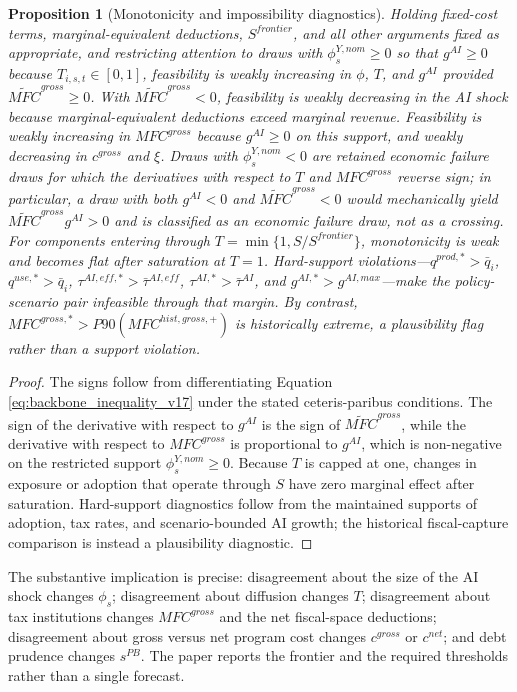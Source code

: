 \documentclass[11pt,a4paper]{article}
\newtheorem{proposition}{Proposition}
\begin{document}
\begin{proposition}[Monotonicity and impossibility diagnostics]\label{prop:monotonicity_impossibility}
Holding fixed-cost terms, marginal-equivalent deductions, $S^{frontier}$, and all other arguments fixed as appropriate, and restricting attention to draws with $\phi^{Y,nom}_s\geq0$ so that $g^{AI}\geq0$ because $T_{i,s,t}\in[0,1]$, feasibility is weakly increasing in $\phi$, $T$, and $g^{AI}$ provided $\widetilde{MFC}^{gross}\geq0$. With $\widetilde{MFC}^{gross}<0$, feasibility is weakly decreasing in the AI shock because marginal-equivalent deductions exceed marginal revenue. Feasibility is weakly increasing in $MFC^{gross}$ because $g^{AI}\geq0$ on this support, and weakly decreasing in $c^{gross}$ and $\xi$. Draws with $\phi^{Y,nom}_s<0$ are retained economic failure draws for which the derivatives with respect to $T$ and $MFC^{gross}$ reverse sign; in particular, a draw with both $g^{AI}<0$ and $\widetilde{MFC}^{gross}<0$ would mechanically yield $\widetilde{MFC}^{gross}g^{AI}>0$ and is classified as an economic failure draw, not as a crossing. For components entering through $T=\min\{1,S/S^{frontier}\}$, monotonicity is weak and becomes flat after saturation at $T=1$. Hard-support violations---$q^{prod,*}>\bar q_i$, $q^{use,*}>\bar q_i$, $\tau^{AI,eff,*}>\bar\tau^{AI,eff}$, $\tau^{AI,*}>\bar\tau^{AI}$, and $g^{AI,*}>g^{AI,max}$---make the policy-scenario pair infeasible through that margin. By contrast, $MFC^{gross,*}>P90(MFC^{hist,gross,+})$ is historically extreme, a plausibility flag rather than a support violation.
\end{proposition}

\begin{proof}
The signs follow from differentiating Equation \eqref{eq:backbone_inequality_v17} under the stated ceteris-paribus conditions. The sign of the derivative with respect to $g^{AI}$ is the sign of $\widetilde{MFC}^{gross}$, while the derivative with respect to $MFC^{gross}$ is proportional to $g^{AI}$, which is non-negative on the restricted support $\phi^{Y,nom}_s\geq0$. Because $T$ is capped at one, changes in exposure or adoption that operate through $S$ have zero marginal effect after saturation. Hard-support diagnostics follow from the maintained supports of adoption, tax rates, and scenario-bounded AI growth; the historical fiscal-capture comparison is instead a plausibility diagnostic.
\end{proof}

The substantive implication is precise: disagreement about the size of the AI shock changes $\phi_s$; disagreement about diffusion changes $T$; disagreement about tax institutions changes $MFC^{gross}$ and the net fiscal-space deductions; disagreement about gross versus net program cost changes $c^{gross}$ or $c^{net}$; and debt prudence changes $s^{PB}$. The paper reports the frontier and the required thresholds rather than a single forecast.
\end{document}
